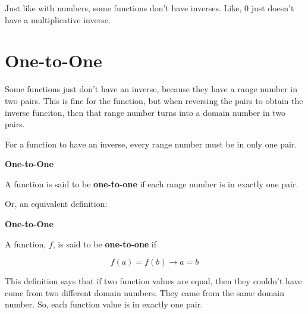 \documentclass{ximera}
\begin{document}
Just like with numbers, some functions don't have inverses.  Like, $0$ just doesn't have a multiplicative inverse.






\section*{One-to-One}


Some functions just don't have an inverse, because they have a range number in two pairs.  This is fine for the function, but when reversing the pairs to obtain the inverse funciton, then that range number turns into a domain number in two pairs.


For a function to have an inverse, every range number must be in only one pair.



\begin{idea} \textbf{\textcolor{blue!55!black}{One-to-One}}    


A function is said to be \textbf{one-to-one} if each range number is in exactly one pair.


\end{idea}



Or, an equivalent definition:

\begin{idea} \textbf{\textcolor{blue!55!black}{One-to-One}}   


A function, $f$, is said to be \textbf{one-to-one} if 


\[    f(a) = f(b) \rightarrow a = b           \]


\end{idea}





This definition says that if two function values are equal, then they couldn't have come from two different domain numbers.  They came from the same domain number. So, each function value is in exactly one pair.
\end{document}
